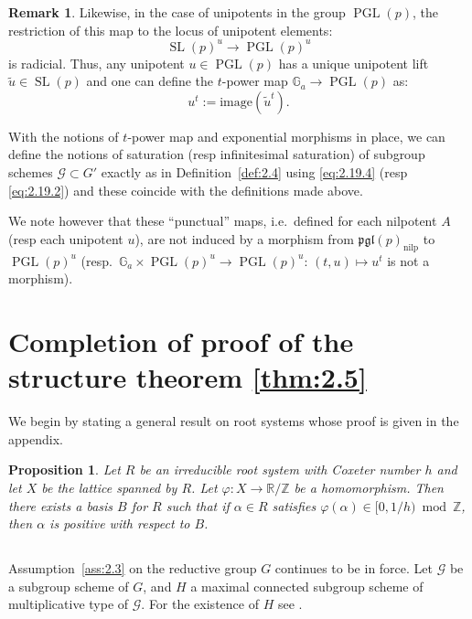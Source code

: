 \documentclass[11pt,a4paper]{article}
\theoremstyle{plain}
\newtheorem{proposition}[theorem]{Proposition}
\theoremstyle{definition}
\newtheorem{remark}[theorem]{Remark}
\DeclareMathOperator{\SL}{SL}
\DeclareMathOperator{\PGL}{PGL}
\newcommand{\G}{\mathbb{G}}
\newcommand{\ZZ}{\mathbb{Z}}
\newcommand{\RR}{\mathbb{R}}
\newcommand{\nilp}{\mathrm{nilp}}
\begin{document}
\begin{remark}
Likewise, in the case of unipotents in the group $\PGL(p)$, the restriction of this map to the locus of unipotent elements:
\begin{equation} \label{eq:2.19.3}
\SL(p)^u \to \PGL(p)^u
\end{equation}
is radicial. Thus, any unipotent $u \in \PGL(p)$ has a unique unipotent lift $\tilde{u} \in \SL(p)$ and one can define the $t$-power map $\G_a \to \PGL(p)$ as:
\begin{equation} \label{eq:2.19.4}
u^t := \text{image}(\tilde{u}^t).
\end{equation}

With the notions of $t$-power map and exponential morphisms in place, we can define the notions of saturation (resp infinitesimal saturation) of subgroup schemes $\mathcal{G} \subset G'$ exactly as in Definition~\ref{def:2.4} using \eqref{eq:2.19.4} (resp \eqref{eq:2.19.2}) and these coincide with the definitions made above.

We note however that these ``punctual'' maps, i.e.~defined for each nilpotent $A$ (resp each unipotent $u$), are not induced by a morphism from $\mathfrak{pgl}(p)_\nilp$ to $\PGL(p)^u$ (resp.~$\G_a \times \PGL(p)^u \to \PGL(p)^u$: $(t,u) \mapsto u^t$ is not a morphism).
\end{remark}


\section{Completion of proof of the structure theorem \ref{thm:2.5}}
\label{sec:3}

We begin by stating a general result on root systems whose proof is given in the appendix.

\begin{proposition} \label{prop:3.1}
Let $R$ be an irreducible root system with Coxeter number $h$ and let $X$ be the lattice spanned by $R$. Let $\varphi : X \to \RR/\ZZ$ be a homomorphism. Then there exists a basis $B$ for $R$ such that if $\alpha \in R$ satisfies $\varphi(\alpha) \in [0, 1/h) \bmod \ZZ$, then $\alpha$ is positive with respect to $B$.
\end{proposition}

\subsection{} \label{sec:3.2}
Assumption~\ref{ass:2.3} on the reductive group $G$ continues to be in force. Let $\mathcal{G}$ be a subgroup scheme of $G$, and $H$ a maximal connected subgroup scheme of multiplicative type of $\mathcal{G}$. For the existence of $H$ see \cite[Proposition~2.1]{D}.
\end{document}
